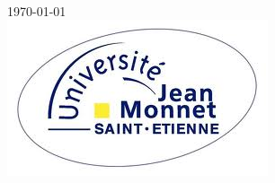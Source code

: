 \documentclass[12pt]{article}
\begin{document}
\begin{titlepage}
\begin{minipage}{0.45\textwidth}
\begin{flushleft}
\end{flushleft}
\end{minipage}\\[4cm]



{\large \today}\\[2cm] %


\includegraphics{ujm.png}\\[1cm] %
 

\vfill %

\end{titlepage}
\end{document}
